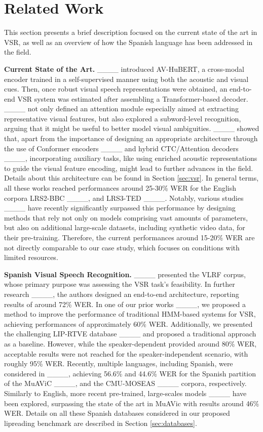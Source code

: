 \section{Related Work}
\label{sec:related}

This section presents a brief description focused on the current state of the art in VSR, as well as an overview of how the Spanish language has been addressed in the field.

\noindent\textbf{Current State of the Art.} ____ introduced AV-HuBERT, a cross-modal encoder trained in a self-supervised manner using both the acoustic and visual cues. Then, once robust visual speech representations were obtained, an end-to-end VSR system was estimated after assembling a Transformer-based decoder. ____ not only defined an attention module especially aimed at extracting representative visual features, but also explored a subword-level recognition, arguing that it might be useful to better model visual ambiguities. ____ showed that, apart from the importance of designing an appropriate architecture through the use of Conformer encoders ____ and hybrid CTC/Attention decoders ____, incorporating auxiliary tasks, like using enriched acoustic representations to guide the visual feature encoding, might lead to further advances in the field. Details about this architecture can be found in Section \ref{sec:vsr}. In general terms, all these works reached performances around 25-30\% WER for the English corpora LRS2-BBC ____, and LRS3-TED ____. Notably, various studies ____ have recently significantly surpassed this performance by designing methods that rely not only on models comprising vast amounts of parameters, but also on additional large-scale datasets, including synthetic video data, for their pre-training. Therefore, the current performances around 15-20\% WER are not directly comparable to our case study, which focuses on conditions with limited resources.

\noindent\textbf{Spanish Visual Speech Recognition.} ____ presented the VLRF corpus, whose primary purpose was assessing the VSR task's feasibility. In further research ____, the authors designed an end-to-end architecture, reporting results of around 72\% WER. In one of our prior works ____, we proposed a method to improve the performance of traditional HMM-based systems for VSR, achieving performances of approximately 60\% WER. Additionally, we presented the challenging LIP-RTVE database ____ and proposed a traditional approach as a baseline. However, while the speaker-dependent provided around 80\% WER, acceptable results were not reached for the speaker-independent scenario, with roughly 95\% WER. Recently, multiple languages, including Spanish, were considered in ____, achieving 56.6\% and 44.6\% WER for the Spanish partition of the MuAViC ____, and the CMU-MOSEAS ____ corpora, respectively. Similarly to English, more recent pre-trained, large-scales models ____ have been explored, surpassing the state of the art in MuAVic with results around 46\% WER. Details on all these Spanish databases considered in our proposed lipreading benchmark are described in Section \ref{sec:databases}.